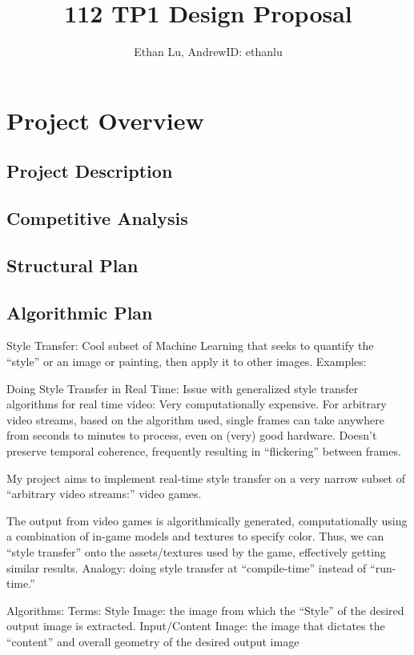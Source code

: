 \documentclass[12pt]{article}
\begin{document}
\title{112 TP1 Design Proposal}
\author{Ethan Lu, AndrewID: ethanlu}
\maketitle
\section{Project Overview}

\subsection{Project Description}

\subsection{Competitive Analysis}

\subsection{Structural Plan}

\subsection{Algorithmic Plan}
Style Transfer:
Cool subset of Machine Learning that seeks to quantify the “style” or an image or painting, then apply it to other images. 
Examples:


Doing Style Transfer in Real Time:
Issue with generalized style transfer algorithms for real time video: 
Very computationally expensive. For arbitrary video streams, based on the algorithm used, single frames can take anywhere from seconds to minutes to process, even on (very) good hardware. 
Doesn’t preserve temporal coherence, frequently resulting in “flickering” between frames. 

My project aims to implement real-time style transfer on a very narrow subset of “arbitrary video streams:” video games.

The output from video games is algorithmically generated, computationally using a combination of in-game models and textures to specify color.
Thus, we can “style transfer” onto the assets/textures used by the game, effectively getting similar results. 
Analogy: doing style transfer at “compile-time” instead of “run-time.”

Algorithms:
Terms:
Style Image: the image from which the “Style” of the desired output image is extracted.
Input/Content Image: the image that dictates the “content” and overall geometry of the desired output image
\end{document}

